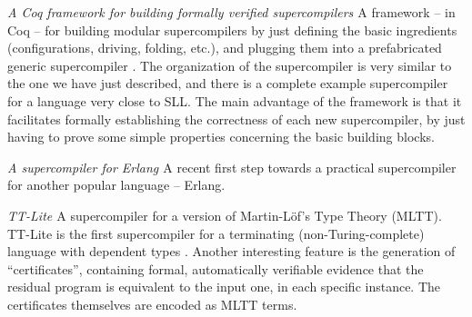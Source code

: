 \begin{longitem}
\item \emph{A Coq framework for building formally verified supercompilers \cite{CoqGenScpUrl}} 
A framework -- in Coq -- for building modular supercompilers by just defining 
the basic ingredients (configurations, driving, folding, etc.),
and plugging them into a prefabricated generic supercompiler \cite{TFP2012:CoqGenScp}.
The organization of the supercompiler is very similar to the one we have just described,
and there is a complete example supercompiler for a language very close to SLL.
The main advantage of the framework is that it facilitates formally establishing
the correctness of each new supercompiler, by just having to prove some simple properties
concerning the basic building blocks.

\item \emph{A supercompiler for Erlang \cite{ErlangScpUrl}} A recent
first step towards a practical supercompiler for another popular language -- Erlang.

\item \emph{TT-Lite \cite{TTliteUrl}} A supercompiler
for a version of Martin-L\"{o}f's Type Theory (MLTT).
TT-Lite is the first supercompiler for a terminating (non-Turing-complete) language
with dependent types \cite{Klyuchnikov2013TTLite}. 
Another interesting feature is the generation of ``certificates'',
containing formal, automatically verifiable evidence 
that the residual program is equivalent to the input one, in each specific instance. 
The certificates themselves are encoded as MLTT terms.

\end{longitem}
